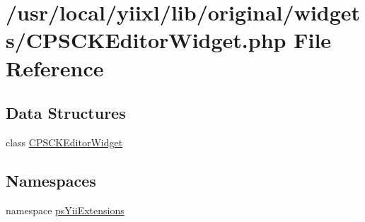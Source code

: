\hypertarget{CPSCKEditorWidget_8php}{
\section{/usr/local/yiixl/lib/original/widgets/CPSCKEditorWidget.php File Reference}
\label{CPSCKEditorWidget_8php}
}
\subsection*{Data Structures}
\begin{DoxyCompactItemize}
\item 
class \hyperlink{classCPSCKEditorWidget}{CPSCKEditorWidget}
\end{DoxyCompactItemize}
\subsection*{Namespaces}
\begin{DoxyCompactItemize}
\item 
namespace \hyperlink{namespacepsYiiExtensions}{psYiiExtensions}
\end{DoxyCompactItemize}
